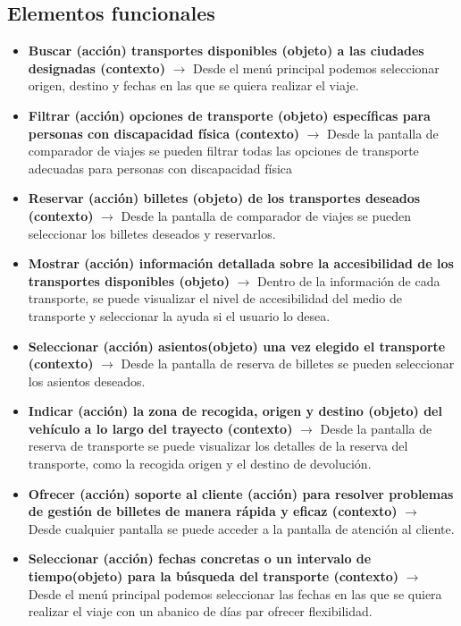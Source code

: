 \subsection{Elementos funcionales}
\begin{itemize}
    \item \textbf{Buscar (acción) transportes disponibles (objeto) a las ciudades designadas (contexto)} $\rightarrow$ Desde el menú principal podemos seleccionar 
    origen, destino y fechas en las que se quiera realizar el viaje.
    \item \textbf{Filtrar (acción) opciones de transporte (objeto) específicas para personas con discapacidad física (contexto)} $\rightarrow$ Desde la pantalla 
    de comparador de viajes se pueden filtrar todas las opciones de transporte adecuadas para personas con discapacidad física
    \item \textbf{Reservar (acción) billetes (objeto) de los transportes deseados (contexto)} $\rightarrow$ Desde la pantalla de comparador de viajes se pueden 
    seleccionar los billetes deseados y reservarlos.
    \item \textbf{Mostrar (acción) información detallada sobre la accesibilidad de los transportes disponibles (objeto)} $\rightarrow$ Dentro de la información de 
    cada transporte, se puede visualizar el nivel de accesibilidad del medio de transporte y seleccionar la ayuda si el usuario lo desea.
    \item \textbf{Seleccionar (acción) asientos(objeto) una vez elegido el transporte (contexto)} $\rightarrow$ Desde la pantalla de reserva de billetes se 
    pueden seleccionar los asientos deseados.
    \item \textbf{Indicar (acción) la zona de recogida, origen y destino (objeto) del vehículo a lo largo del trayecto (contexto)} $\rightarrow$ Desde la pantalla 
    de reserva de transporte se puede visualizar los detalles de la reserva del transporte, como la recogida origen y el destino de devolución.
    \item \textbf{Ofrecer (acción) soporte al cliente (acción) para resolver problemas de gestión de billetes de manera rápida y eficaz (contexto)} $\rightarrow$ Desde 
    cualquier pantalla se puede acceder a la pantalla de atención al cliente.
    \item \textbf{Seleccionar (acción) fechas concretas o un intervalo de tiempo(objeto) para la búsqueda del transporte (contexto)} $\rightarrow$ Desde el menú 
    principal podemos seleccionar las fechas en las que se quiera realizar el viaje con un abanico de días par ofrecer flexibilidad.

\end{itemize}
